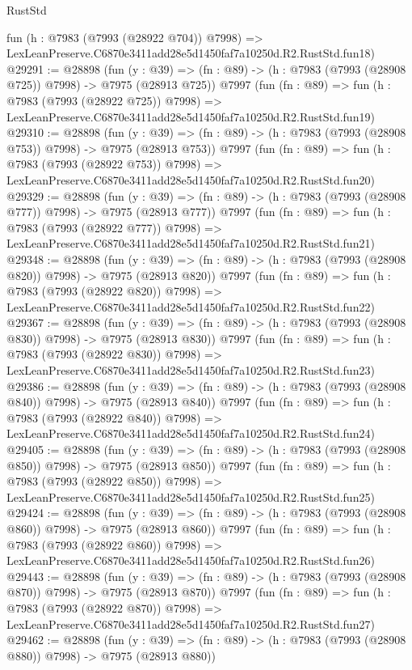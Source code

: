 \begin{lexlean}{RustStd}
\begin{coremodule}
    fun (h : @7983 (@7993 (@28922 @704)) @7998) =>
    LexLeanPreserve.C6870e3411add28e5d1450faf7a10250d.R2.RustStd.fun18)
@29291 := @28898
    (fun (y : @39) => (fn : @89) -> (h : @7983 (@7993 (@28908 @725)) @7998) -> @7975 (@28913 @725))
    @7997
    (fun (fn : @89) =>
    fun (h : @7983 (@7993 (@28922 @725)) @7998) =>
    LexLeanPreserve.C6870e3411add28e5d1450faf7a10250d.R2.RustStd.fun19)
@29310 := @28898
    (fun (y : @39) => (fn : @89) -> (h : @7983 (@7993 (@28908 @753)) @7998) -> @7975 (@28913 @753))
    @7997
    (fun (fn : @89) =>
    fun (h : @7983 (@7993 (@28922 @753)) @7998) =>
    LexLeanPreserve.C6870e3411add28e5d1450faf7a10250d.R2.RustStd.fun20)
@29329 := @28898
    (fun (y : @39) => (fn : @89) -> (h : @7983 (@7993 (@28908 @777)) @7998) -> @7975 (@28913 @777))
    @7997
    (fun (fn : @89) =>
    fun (h : @7983 (@7993 (@28922 @777)) @7998) =>
    LexLeanPreserve.C6870e3411add28e5d1450faf7a10250d.R2.RustStd.fun21)
@29348 := @28898
    (fun (y : @39) => (fn : @89) -> (h : @7983 (@7993 (@28908 @820)) @7998) -> @7975 (@28913 @820))
    @7997
    (fun (fn : @89) =>
    fun (h : @7983 (@7993 (@28922 @820)) @7998) =>
    LexLeanPreserve.C6870e3411add28e5d1450faf7a10250d.R2.RustStd.fun22)
@29367 := @28898
    (fun (y : @39) => (fn : @89) -> (h : @7983 (@7993 (@28908 @830)) @7998) -> @7975 (@28913 @830))
    @7997
    (fun (fn : @89) =>
    fun (h : @7983 (@7993 (@28922 @830)) @7998) =>
    LexLeanPreserve.C6870e3411add28e5d1450faf7a10250d.R2.RustStd.fun23)
@29386 := @28898
    (fun (y : @39) => (fn : @89) -> (h : @7983 (@7993 (@28908 @840)) @7998) -> @7975 (@28913 @840))
    @7997
    (fun (fn : @89) =>
    fun (h : @7983 (@7993 (@28922 @840)) @7998) =>
    LexLeanPreserve.C6870e3411add28e5d1450faf7a10250d.R2.RustStd.fun24)
@29405 := @28898
    (fun (y : @39) => (fn : @89) -> (h : @7983 (@7993 (@28908 @850)) @7998) -> @7975 (@28913 @850))
    @7997
    (fun (fn : @89) =>
    fun (h : @7983 (@7993 (@28922 @850)) @7998) =>
    LexLeanPreserve.C6870e3411add28e5d1450faf7a10250d.R2.RustStd.fun25)
@29424 := @28898
    (fun (y : @39) => (fn : @89) -> (h : @7983 (@7993 (@28908 @860)) @7998) -> @7975 (@28913 @860))
    @7997
    (fun (fn : @89) =>
    fun (h : @7983 (@7993 (@28922 @860)) @7998) =>
    LexLeanPreserve.C6870e3411add28e5d1450faf7a10250d.R2.RustStd.fun26)
@29443 := @28898
    (fun (y : @39) => (fn : @89) -> (h : @7983 (@7993 (@28908 @870)) @7998) -> @7975 (@28913 @870))
    @7997
    (fun (fn : @89) =>
    fun (h : @7983 (@7993 (@28922 @870)) @7998) =>
    LexLeanPreserve.C6870e3411add28e5d1450faf7a10250d.R2.RustStd.fun27)
@29462 := @28898
    (fun (y : @39) => (fn : @89) -> (h : @7983 (@7993 (@28908 @880)) @7998) -> @7975 (@28913 @880))

\end{coremodule}
\end{lexlean}
